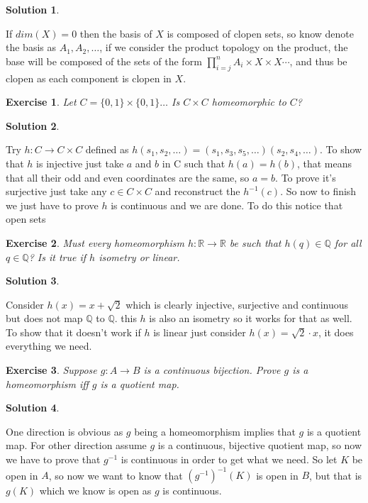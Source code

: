 \documentclass[11pt,a4paper]{article}
\newtheorem{Ex}{Exercise}
\newtheorem{Sol}{Solution}
\newcommand{\R}{\mathbb{R}}
\newcommand{\ra}{\rightarrow}
\begin{document}
\begin{Sol}\end{Sol}
\noindent If $dim(X)=0$ then the basis of $X$ is composed of clopen sets, so know denote the basis as $A_1,A_2,\dots$, if we consider the product topology on the product, the base will be composed of the sets of the form $\prod_{i=j}^{n}A_i \times X \times X \cdots$, and thus be clopen as each component is clopen in $X$.

\begin{Ex}
	Let $C = \{0,1\} \times \{0,1\} \dots$ Is $C\times C$ homeomorphic to $C$? 
\end{Ex}

\begin{Sol}\end{Sol}
Try $h: C \ra C \times C$ defined as $h(s_1,s_2,\dots) = (s_1,s_3,s_5,\dots)(s_2,s_4,\dots)$. To show that $h$ is injective just take $a$ and $b$ in C such that $h(a) = h(b)$, that means that all their odd and even coordinates are the same, so $a = b$. To prove it's surjective just take any $c \in C \times C$ and reconstruct the $h^{-1}(c)$. So now to finish we just have to prove $h$ is continuous and we are done. To do this notice that open sets 


\begin{Ex}
	Must every homeomorphism $h: \R \ra \R$ be such that $h(q) \in \mathbb{Q}$ for all $q \in \mathbb{Q}$? Is it true if $h$ isometry or linear.
\end{Ex}

\begin{Sol}\end{Sol}
\noindent Consider $h(x) = x +\sqrt{2}$ which is clearly injective, surjective and continuous but does not map $\mathbb{Q}$ to $\mathbb{Q}$. this $h$ is also an isometry so it works for that as well. To show that it doesn't work if $h$ is linear just consider $h(x) = \sqrt{2} \cdot x$, it does everything we need.

\begin{Ex}
	Suppose $g: A \ra B$ is a continuous bijection. Prove $g$ is a homeomorphism iff $g$ is a quotient map.
 \end{Ex} 
\begin{Sol}
\end{Sol}
\noindent One direction is obvious as $g$ being a homeomorphism implies that $g$ is a quotient map. For other direction assume $g$ is a continuous, bijective quotient map, so now we have to prove that $g^{-1}$ is continuous in order to get what we need. So let $K$ be open in $A$, so now we want to know that $(g^{-1})^{-1}(K)$ is open in $B$, but that is $g(K)$ which we know is open as $g$ is continuous.
\end{document}
